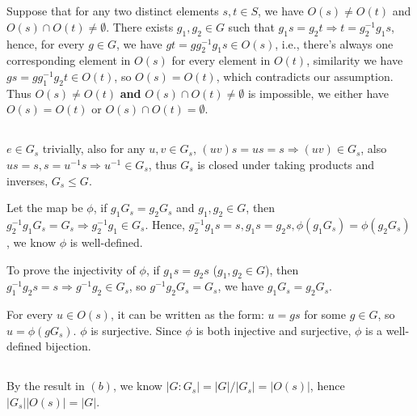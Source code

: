 \documentclass[12pt]{article}
\title{\mytitle}
\author{\textbf{\myauthor}}
\date{}
\begin{document}
\onehalfspacing
\maketitle

\section{}
\subsection{}
Suppose that for any two distinct elements $s,t\in S$, we have $O(s)\ne O(t)$ and $O(s)\cap O(t)\ne\emptyset$. There exists $g_1,g_2\in G$ such that $g_1s=g_2t\Rightarrow t=g_2^{-1}g_1s$, hence, for every $g\in G$, we have $gt=gg_2^{-1}g_1s\in O(s)$, i.e., there's always one corresponding element in $O(s)$ for every element in $O(t)$, similarity we have $gs=gg_1^{-1}g_2t\in O(t)$, so $O(s)=O(t)$, which contradicts our assumption. Thus $O(s)\ne O(t)$ \textbf{and} $O(s)\cap O(t)\ne\emptyset$ is impossible, we either have $O(s)=O(t)$ or $O(s)\cap O(t)=\emptyset$.
\subsection{}
$e\in G_s$ trivially, also for any $u,v\in G_s$, $(uv)s=us=s\Rightarrow (uv)\in G_s$, also $us=s,s=u^{-1}s\Rightarrow u^{-1}\in G_s$, thus $G_s$ is closed under taking products and inverses, $G_s\le G$.

Let the map be $\phi$, if $g_1G_s=g_2G_s$ and $g_1,g_2\in G$, then $g_2^{-1}g_1G_s=G_s\Rightarrow g_2^{-1}g_1\in G_s$. Hence, $g_2^{-1}g_1s=s, g_1s=g_2s, \phi(g_1G_s)=\phi(g_2G_s)$, we know $\phi$ is well-defined.

To prove the injectivity of $\phi$, if $g_1s=g_2s$ ($g_1,g_2\in G$), then $g_1^{-1}g_2s=s\Rightarrow g^{-1}g_2\in G_s$, so $g^{-1}g_2G_s=G_s$, we have $g_1G_s=g_2G_s$.

For every $u\in O(s)$, it can be written as the form: $u=gs$ for some $g\in G$, so $u=\phi(gG_s)$. $\phi$ is surjective. Since $\phi$ is both injective and surjective, $\phi$ is a well-defined bijection.
\subsection{}
By the result in $(b)$, we know $|G:G_s|=|G|/|G_s|=|O(s)|$, hence $|G_s||O(s)|=|G|$.

\section{}
\end{document}
